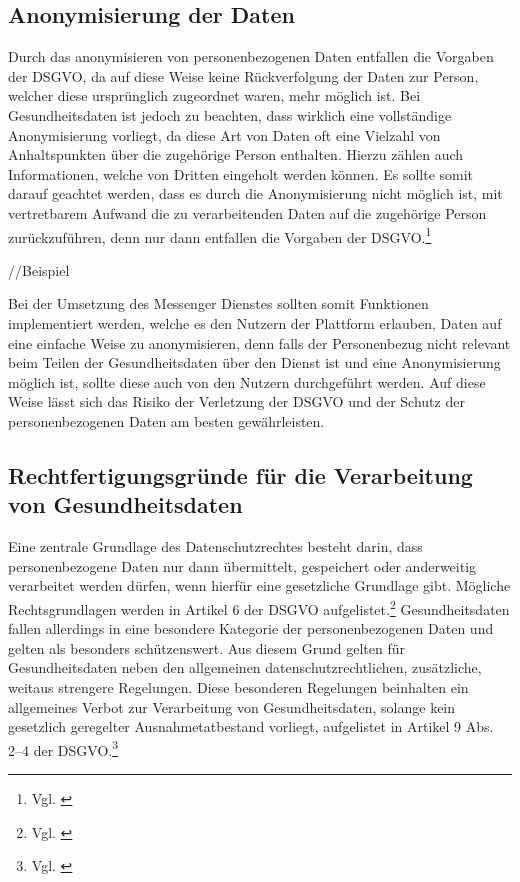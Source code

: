 \subsection{Anonymisierung der Daten}\label{subsection:add}
Durch das anonymisieren von personenbezogenen Daten entfallen die Vorgaben der DSGVO, da auf diese Weise keine Rückverfolgung der Daten zur Person, welcher diese ursprünglich zugeordnet waren, mehr möglich ist. Bei Gesundheitsdaten ist jedoch zu beachten, dass wirklich eine vollständige Anonymisierung vorliegt, da diese Art von Daten oft eine Vielzahl von Anhaltspunkten über die zugehörige Person enthalten. Hierzu zählen auch Informationen, welche von Dritten eingeholt werden können. Es sollte somit darauf geachtet werden, dass es durch die Anonymisierung nicht möglich ist, mit vertretbarem Aufwand die zu verarbeitenden Daten auf die zugehörige Person zurückzuführen, denn nur dann entfallen die Vorgaben der DSGVO.\footnote{Vgl. \cite[S. 5 f.]{OrientierungshilfezumGesundheitsdatenschutz2018}}

//Beispiel

Bei der Umsetzung des Messenger Dienstes sollten somit Funktionen implementiert werden, welche es den Nutzern der Plattform erlauben, Daten auf eine einfache Weise zu anonymisieren, denn falls der Personenbezug nicht relevant beim Teilen der Gesundheitsdaten über den Dienst ist und eine Anonymisierung möglich ist, sollte diese auch von den Nutzern durchgeführt werden. Auf diese Weise lässt sich das Risiko der Verletzung der DSGVO und der Schutz der personenbezogenen Daten am besten gewährleisten.

\subsection{Rechtfertigungsgründe für die Verarbeitung von Gesundheitsdaten}\label{subsection:rfdvvg}
Eine zentrale Grundlage des Datenschutzrechtes besteht darin, dass personenbezogene Daten nur dann übermittelt, gespeichert oder anderweitig verarbeitet werden dürfen, wenn hierfür eine gesetzliche Grundlage gibt. Mögliche Rechtsgrundlagen werden in Artikel 6 der DSGVO aufgelistet.\footnote{Vgl. \cite[S. 5 f.]{OrientierungshilfezumGesundheitsdatenschutz2018}} Gesundheitsdaten fallen allerdings in eine besondere Kategorie der personenbezogenen Daten und gelten als besonders schützenswert. Aus diesem Grund gelten für Gesundheitsdaten neben den allgemeinen datenschutzrechtlichen, zusätzliche, weitaus strengere Regelungen. Diese besonderen Regelungen beinhalten ein allgemeines Verbot zur Verarbeitung von Gesundheitsdaten, solange kein gesetzlich geregelter Ausnahmetatbestand vorliegt, aufgelistet in Artikel 9 Abs. 2–4 der DSGVO.\footnote{Vgl. \cite[S. 20 ff.]{OrientierungshilfezumGesundheitsdatenschutz2018}}

